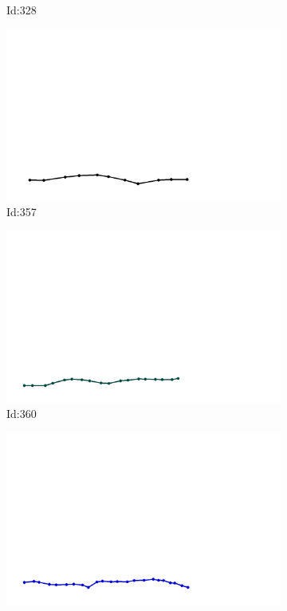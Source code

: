 \documentclass[12pt,twoside]{report}
\begin{document}
\begin{figure}
\begin{subfigure}[b]{0.20\textwidth}
\caption{Id:328}
\end{subfigure}
\begin{subfigure}[b]{0.20\textwidth}
\centering
\includegraphics[width=\textwidth]{../trajectories/357.png}
\caption{Id:357}
\end{subfigure}
\begin{subfigure}[b]{0.20\textwidth}
\centering
\includegraphics[width=\textwidth]{../trajectories/360.png}
\caption{Id:360}
\end{subfigure}
\begin{subfigure}[b]{0.20\textwidth}
\centering
\includegraphics[width=\textwidth]{../trajectories/361.png}

\end{subfigure}
\end{figure}
\end{document}
